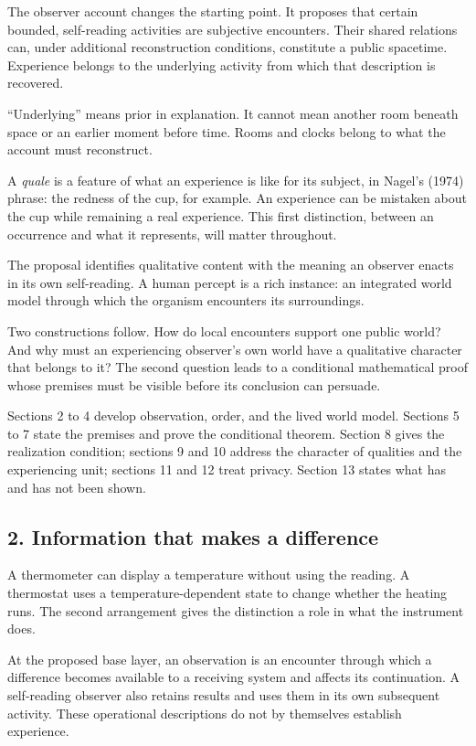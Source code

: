\documentclass[
  11pt,
]{article}
\begin{document}
The observer account changes the starting point. It proposes that
certain bounded, self-reading activities are subjective encounters.
Their shared relations can, under additional reconstruction conditions,
constitute a public spacetime. Experience belongs to the underlying
activity from which that description is recovered.

``Underlying'' means prior in explanation. It cannot mean another room
beneath space or an earlier moment before time. Rooms and clocks belong
to what the account must reconstruct.

A \emph{quale} is a feature of what an experience is like for its
subject, in Nagel's (1974) phrase: the redness of the cup, for example.
An experience can be mistaken about the cup while remaining a real
experience. This first distinction, between an occurrence and what it
represents, will matter throughout.

The proposal identifies qualitative content with the meaning an observer
enacts in its own self-reading. A human percept is a rich instance: an
integrated world model through which the organism encounters its
surroundings.

Two constructions follow. How do local encounters support one public
world? And why must an experiencing observer's own world have a
qualitative character that belongs to it? The second question leads to a
conditional mathematical proof whose premises must be visible before its
conclusion can persuade.

Sections 2 to 4 develop observation, order, and the lived world model.
Sections 5 to 7 state the premises and prove the conditional theorem.
Section 8 gives the realization condition; sections 9 and 10 address the
character of qualities and the experiencing unit; sections 11 and 12
treat privacy. Section 13 states what has and has not been shown.

\subsection{2. Information that makes a
difference}\label{information-that-makes-a-difference}

A thermometer can display a temperature without using the reading. A
thermostat uses a temperature-dependent state to change whether the
heating runs. The second arrangement gives the distinction a role in
what the instrument does.

At the proposed base layer, an observation is an encounter through which
a difference becomes available to a receiving system and affects its
continuation. A self-reading observer also retains results and uses them
in its own subsequent activity. These operational descriptions do not by
themselves establish experience.
\end{document}
